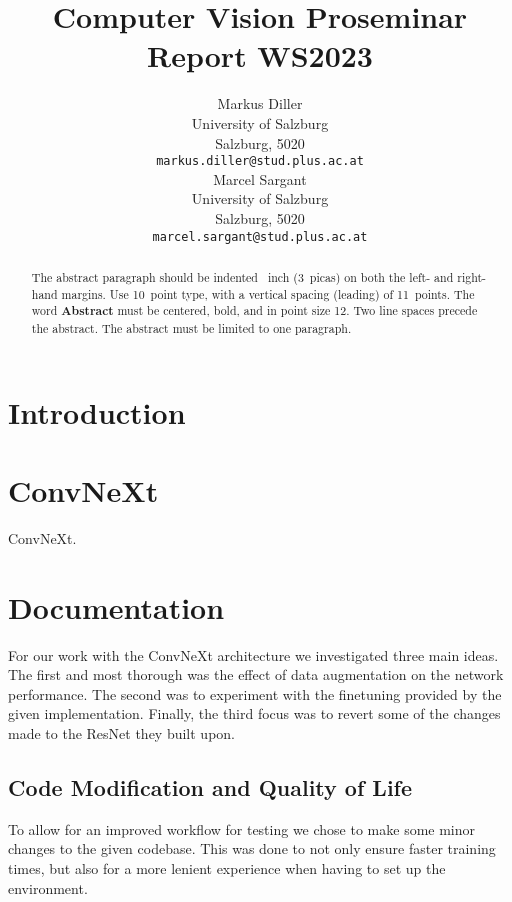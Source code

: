 \documentclass{article}
\title{Computer Vision Proseminar Report WS2023}
\author{%
    Markus Diller\\
    University of Salzburg\\
    Salzburg, 5020 \\
    \texttt{markus.diller@stud.plus.ac.at} \\
    \And
    Marcel Sargant \\
    University of Salzburg \\
    Salzburg, 5020 \\
    \texttt{marcel.sargant@stud.plus.ac.at} \\
}
\begin{document}
    \maketitle


    \begin{abstract}
        The abstract paragraph should be indented ~inch (3~picas) on both the left- and right-hand margins.
        Use 10~point type, with a vertical spacing (leading) of 11~points.
        The word \textbf{Abstract} must be centered, bold, and in point size 12.
        Two line spaces precede the abstract.
        The abstract must be limited to one paragraph.
    \end{abstract}


    \section{Introduction}\label{sec:introduction}


    \section{ConvNeXt}\label{sec:convnext}
    ConvNeXt\cite{liu2022convnet}.


    \section{Documentation}\label{sec:documentation}
    For our work with the ConvNeXt architecture we investigated three main ideas.
    The first and most thorough was the effect of data augmentation on the network performance.
    The second was to experiment with the finetuning provided by the given implementation.
    Finally, the third focus was to revert some of the changes  made to the ResNet they built upon.

    \subsection{Code Modification and Quality of Life}\label{subsec:code-modification}
    To allow for an improved workflow for testing we chose to make some minor changes to the given codebase.
    This was done to not only ensure faster training times, but also for a more lenient experience when having to set up the environment.
\end{document}
